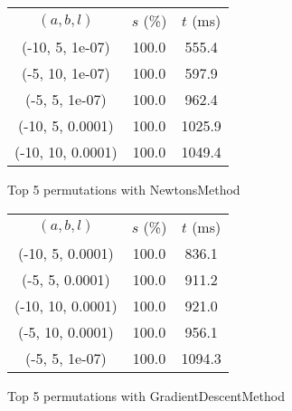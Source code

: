 \begin{figure}[H]
\label{fig:param_comp_MatrixSquareSum_BisectionSearch}
\begin{subfigure}[ht]{.5\textwidth}
\begin{tabular}{|c|c|c|}
\hline
\rowcolor{gray!25}
\multicolumn{3}{|c|}{NewtonsMethod} \\
\hline
\rowcolor{gray!25}
$(a,b,l)$ & $s$ (\%) & $t$ (ms) \\
\hline
(-10, 5, 1e-07) & 100.0 & 555.4 \\
(-5, 10, 1e-07) & 100.0 & 597.9 \\
(-5, 5, 1e-07) & 100.0 & 962.4 \\
(-10, 5, 0.0001) & 100.0 & 1025.9 \\
(-10, 10, 0.0001) & 100.0 & 1049.4 \\
\hline
\end{tabular}
\caption{Top 5 permutations with NewtonsMethod}
\label{subfig:param_comp_MatrixSquareSum_NewtonsMethod_BisectionSearch}
\end{subfigure}
\hfill
\begin{subfigure}[ht]{.5\textwidth}
\begin{tabular}{|c|c|c|}
\hline
\rowcolor{gray!25}
\multicolumn{3}{|c|}{GradientDescentMethod} \\
\hline
\rowcolor{gray!25}
$(a,b,l)$ & $s$ (\%) & $t$ (ms) \\
\hline
(-10, 5, 0.0001) & 100.0 & 836.1 \\
(-5, 5, 0.0001) & 100.0 & 911.2 \\
(-10, 10, 0.0001) & 100.0 & 921.0 \\
(-5, 10, 0.0001) & 100.0 & 956.1 \\
(-5, 5, 1e-07) & 100.0 & 1094.3 \\
\hline
\end{tabular}
\caption{Top 5 permutations with GradientDescentMethod}
\label{subfig:param_comp_MatrixSquareSum_GradientDescentMethod_BisectionSearch}
\end{subfigure}
\hfill
\begin{subfigure}[ht]{.5\textwidth}
\begin{tabular}{|c|c|c|}
\hline
\rowcolor{gray!25}
\multicolumn{3}{|c|}{ConjugateGradientMethod} \\
\hline

\end{tabular}
\end{subfigure}
\end{figure}
